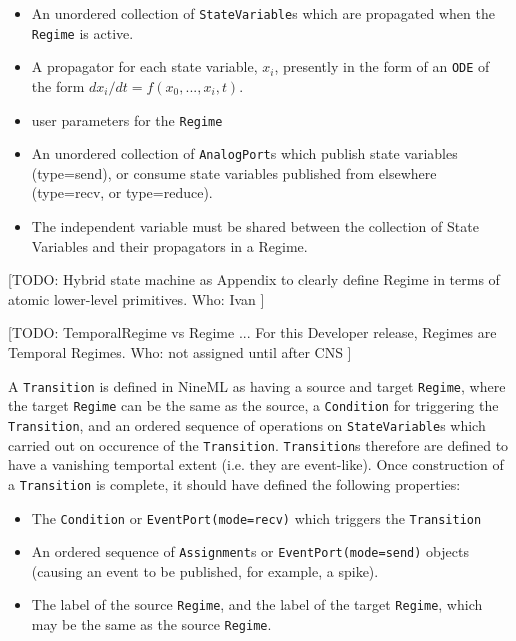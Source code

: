 \documentclass[a4paper]{article}
\newcommand\nmlClass[1]{{\tt #1}}
\begin{document}
\begin{itemize}
\item An unordered collection of \nmlClass{StateVariable}s which are propagated when the \nmlClass{Regime} is active.
\item A propagator for each state variable, $x_i$, presently in the
  form of an \nmlClass{ODE} of the form $dx_i/dt = f(x_0, ..., x_i, t)$.
\item user parameters for the \nmlClass{Regime}
\item An unordered collection of \nmlClass{AnalogPort}s which publish state variables (type=send),
  or consume state variables published from elsewhere (type=recv, or type=reduce).
\item The independent variable must be shared between the collection
of State Variables and their propagators in a Regime.
\end{itemize}

[TODO: Hybrid state machine as Appendix to clearly define Regime
in terms of atomic lower-level primitives.
Who: Ivan
]

[TODO:
TemporalRegime vs Regime ...
For this Developer release, Regimes are Temporal Regimes.
Who: not assigned until after CNS
]

A \nmlClass{Transition} is defined in NineML as having a source and target
\nmlClass{Regime}, where the target \nmlClass{Regime} can be the same as the source, a
\nmlClass{Condition} for triggering the \nmlClass{Transition}, and an ordered sequence of
operations on \nmlClass{StateVariable}s which carried out on occurence of the
\nmlClass{Transition}.  \nmlClass{Transition}s therefore are defined to have a vanishing
temportal extent (i.e. they are event-like).  Once construction of a
\nmlClass{Transition} is complete, it should have defined the following properties:
\begin{itemize}
\item The \nmlClass{Condition} or \nmlClass{EventPort(mode=recv)} which triggers the \nmlClass{Transition}
\item An ordered sequence of \nmlClass{Assignment}s or
  \nmlClass{EventPort(mode=send)} objects (causing an event to be published, for example, a spike).
\item The label of the source \nmlClass{Regime}, and the label of the target
  \nmlClass{Regime}, which may be the same as the source \nmlClass{Regime}.
\end{itemize}
\end{document}
